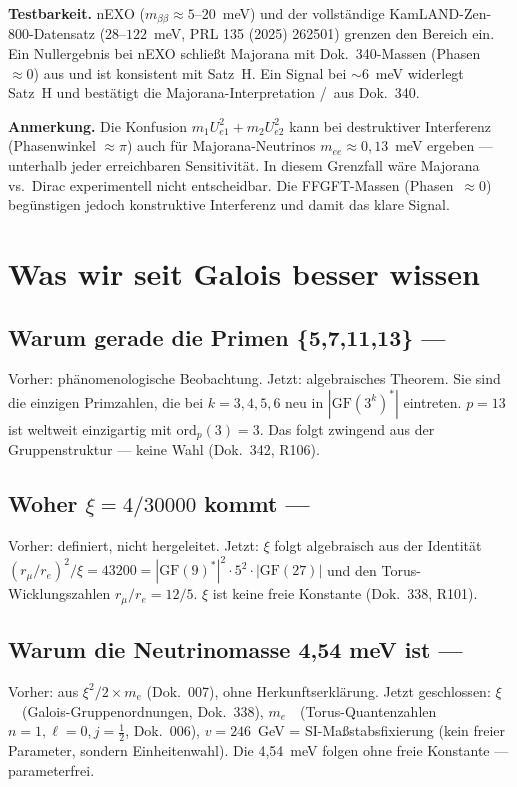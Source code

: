 \textbf{Testbarkeit.} nEXO ($m_{\beta\beta}\approx5$--$20$~meV) und der vollständige KamLAND-Zen-800-Datensatz
($28$--$122$~meV, PRL 135 (2025) 262501) grenzen den Bereich ein. Ein Nullergebnis bei nEXO
schließt Majorana mit Dok.~340-Massen (Phasen~$\approx 0$) aus und ist konsistent
mit Satz~H. Ein Signal bei $\sim 6$~meV widerlegt Satz~H und bestätigt die
Majorana-Interpretation \BM/\SM\ aus Dok.~340.

\textbf{Anmerkung.} Die Konfusion $m_1 U_{e1}^2 + m_2 U_{e2}^2$ kann bei destruktiver
Interferenz (Phasenwinkel $\approx \pi$) auch für Majorana-Neutrinos $m_{ee} \approx 0{,}13$~meV
ergeben --- unterhalb jeder erreichbaren Sensitivität. In diesem Grenzfall wäre
Majorana vs.\ Dirac experimentell nicht entscheidbar. Die FFGFT-Massen (Phasen~$\approx 0$)
begünstigen jedoch konstruktive Interferenz und damit das klare Signal.


\section*{Was wir seit Galois besser wissen}

\subsection*{Warum gerade die Primen \{5,7,11,13\} --- \KM}
Vorher: phänomenologische Beobachtung.
Jetzt: algebraisches Theorem.
Sie sind die einzigen Primzahlen, die bei $k=3,4,5,6$ neu in $|\mathrm{GF}(3^k)^*|$
eintreten. $p=13$ ist weltweit einzigartig mit $\mathrm{ord}_p(3)=3$.
Das folgt zwingend aus der Gruppenstruktur --- keine Wahl (Dok.~342, R106).

\subsection*{Woher $\xi = 4/30000$ kommt --- \KM}
Vorher: definiert, nicht hergeleitet.
Jetzt: $\xi$ folgt algebraisch aus der Identität
$(r_\mu/r_e)^2/\xi = 43200 = |\mathrm{GF}(9)^*|^2 \cdot 5^2 \cdot |\mathrm{GF}(27)|$
und den Torus-Wicklungszahlen $r_\mu/r_e = 12/5$.
$\xi$ ist keine freie Konstante (Dok.~338, R101).

\subsection*{Warum die Neutrinomasse 4,54 meV ist --- \KM}
Vorher: aus $\xi^2/2 \times m_e$ (Dok.~007), ohne Herkunftserklärung.
Jetzt geschlossen: $\xi$~\KM\ (Galois-Gruppenordnungen, Dok.~338),
$m_e$~\KM\ (Torus-Quantenzahlen $n=1,\ell=0,j=\tfrac{1}{2}$, Dok.~006),
$v=246$~GeV = SI-Maßstabsfixierung (kein freier Parameter, sondern Einheitenwahl).
Die 4,54~meV folgen ohne freie Konstante --- parameterfrei.

